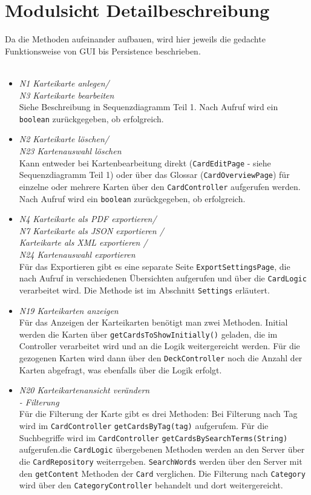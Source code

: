 \documentclass[fontsize=12pt,paper=A4,twoside]{scrartcl}
\begin{document}
    \section{Modulsicht Detailbeschreibung}
    Da die Methoden aufeinander aufbauen, wird hier jeweils die gedachte Funktionsweise von GUI bis Persistence beschrieben.\\\\
    \begin{itemize}
    \item \textit{N1 Karteikarte anlegen/\\ N3 Karteikarte bearbeiten}\\ 
    Siehe Beschreibung in Sequenzdiagramm Teil 1. Nach Aufruf wird ein \texttt{boolean} zurückgegeben, ob erfolgreich.
    \item \textit{N2 Karteikarte löschen/\\ N23 Kartenauswahl löschen}\\ 
    Kann entweder bei Kartenbearbeitung direkt (\texttt{CardEditPage} - siehe Sequenzdiagramm Teil 1) oder über das Glossar (\texttt{CardOverviewPage}) 
    für einzelne oder mehrere Karten über den \texttt{CardController} aufgerufen werden. Nach Aufruf wird ein \texttt{boolean} zurückgegeben, ob erfolgreich.
    \item \textit{N4 Karteikarte als PDF exportieren/\\ 
    N7 Karteikarte als JSON exportieren /\\
    Karteikarte als XML exportieren /\\
    N24 Kartenauswahl exportieren}\\ 
    Für das Exportieren gibt es eine separate Seite \texttt{ExportSettingsPage}, die nach Aufruf 
    in verschiedenen Übersichten aufgerufen und über die \texttt{CardLogic} verarbeitet wird. 
    Die Methode ist im Abschnitt \texttt{Settings} erläutert.
    \item \textit{N19 Karteikarten anzeigen}\\ Für das Anzeigen der Karteikarten benötigt man zwei Methoden. Initial werden die
    Karten über \texttt{getCardsToShowInitially()} geladen, die im Controller verarbeitet wird und an die Logik weitergereicht werden. Für die gezogenen Karten wird
    dann über den \texttt{DeckController} noch die Anzahl der Karten abgefragt, was ebenfalls über die Logik erfolgt.
    \item \textit{N20 Karteikartenansicht verändern\\- Filterung}\\ 
    Für die Filterung der Karte gibt es drei Methoden: Bei Filterung nach Tag wird im \texttt{CardController} \texttt{getCardsByTag(tag)} aufgerufem.
    Für die Suchbegriffe wird im \texttt{CardController} \texttt{getCardsBySearchTerms(String)} aufgerufen.die \texttt{CardLogic} übergebenen Methoden werden an den Server über die \texttt{CardRepository} weiterrgeben. \texttt{SearchWords} werden über 
    den Server mit den \texttt{getContent} Methoden der \texttt{Card} verglichen.
    Die Filterung nach \texttt{Category} wird über den \texttt{CategoryController} behandelt und dort weitergereicht.
    \end{itemize}
\end{document}
